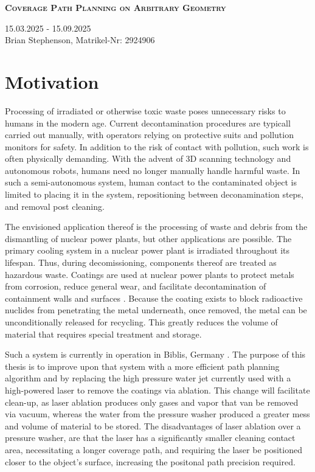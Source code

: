 \documentclass[a4paper, 10pt]{article}
\begin{document}
	
\begin{center}
	\fontsize{24pt}{10pt}\selectfont
	\textsc{\textbf{Coverage Path Planning on Arbitrary Geometry}}
\end{center}
\begin{center}
	15.03.2025 - 15.09.2025 \\
	Brian Stephenson, Matrikel-Nr: 2924906
\end{center}

\section*{Motivation}
Processing of irradiated or otherwise toxic waste poses unnecessary risks to humans in the modern age.
Current decontamination procedures are typicall carried out manually, with operators relying on protective suits and pollution monitors for safety.
In addition to the risk of contact with pollution, such work is often physically demanding.
With the advent of 3D scanning technology and autonomous robots, humans need no longer manually handle harmful waste.
In such a semi-autonomous system, human contact to the contaminated object is limited to placing it in the system, repositioning between deconamination steps, and removal post cleaning.

The envisioned application thereof is the processing of waste and debris from the dismantling of nuclear power plants, but other applications are possible.
The primary cooling system in a nuclear power plant is irradiated throughout its lifespan.
Thus, during decomissioning, components thereof are treated as hazardous waste.
Coatings are used at nuclear power plants to protect metals from corrosion, reduce general wear, and facilitate decontamination of containment walls and surfaces \cite{NRC_coatings}.
Because the coating exists to block radioactive nuclides from penetrating the metal underneath, once removed, the metal can be unconditionally released for recycling\cite{NEA-DnD}.
This greatly reduces the volume of material that requires special treatment and storage.

Such a system is currently in operation in Biblis, Germany \cite{ROBBE22}.
The purpose of this thesis is to improve upon that system with a more efficient path planning algorithm and by replacing the high pressure water jet currently used with a high-powered laser to remove the coatings via ablation.
This change will facilitate clean-up, as laser ablation produces only gases and vapor that van be removed via vacuum, whereas the water from the pressure washer produced a greater mess and volume of material to be stored.
The disadvantages of laser ablation over a pressure washer, are that the laser has a significantly smaller cleaning contact area, necessitating a longer coverage path, and requiring the laser be positioned closer to the object's surface, increasing the positonal path precision required.
\end{document}
